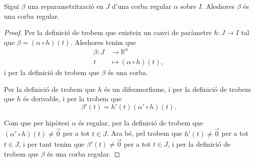 \documentclass[../../Main.tex]{subfiles}
\begin{document}
	\begin{proposition}
		Sigui \(\beta\) una reparametrització en \(J\) d'una corba regular \(\alpha\) sobre \(I\). Aleshores \(\beta\) és una corba regular.
		\begin{proof}
			Per la definició de  trobem que existeix un canvi de paràmetre \(h:J\longrightarrow I\) tal que \(\beta=(\alpha\circ h)(t)\). Aleshores tenim que
			\begin{align*}
				\beta\colon J&\longrightarrow\mathbb{R}^{n} \\
				t&\longmapsto(\alpha\circ h)(t),
			\end{align*}
			i per la definició de  trobem que \(\beta\) és una corba.
			
			Per la definició de  trobem que \(h\) és un difeomorfisme, i per la definició de  trobem que \(h\) és derivable, i per la  trobem que
			\[
			    \beta'(t)=h'(t)(\alpha'\circ h)(t).
			\]
			
			Com que per hipòtesi \(\alpha\) és regular, per la definició de  trobem que \((\alpha'\circ h)(t)\neq\vec{0}\) per a tot \(t\in J\). Ara bé, pel \corollari{}  trobem que \(h'(t)\neq\vec{0}\) per a tot \(t\in J\), i per tant tenim que \(\beta'(t)\neq\vec{0}\) per a tot \(t\in J\), i per la definició de  trobem que \(\beta\) és una corba regular.
		\end{proof}
	\end{proposition}
\end{document}
